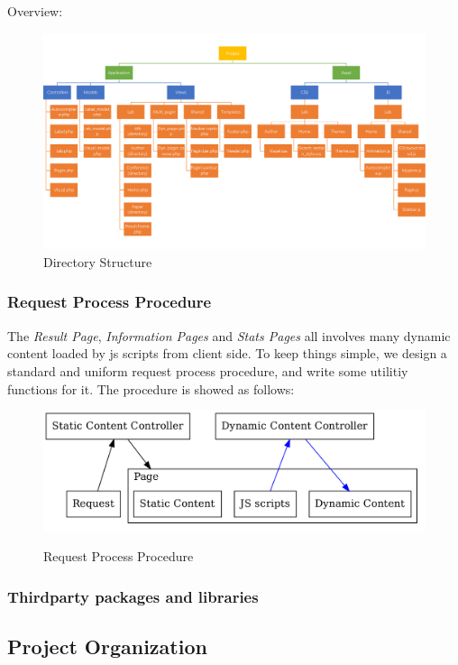 \documentclass[a4paper, 10pt]{article}
\begin{document}
Overview:
\begin{figure}[H]
  \centering
  \includegraphics[width=\textwidth]{directory.png}
  \caption{Directory Structure}
  \label{fig:web_struct}
\end{figure}

\subsubsection{Request Process Procedure}
The \textit{Result Page}, \textit{Information Pages} and \textit{Stats Pages} all involves many dynamic content loaded by js scripts from client side. To keep things simple, we design a standard and uniform request process procedure, and write some utilitiy functions for it.
The procedure is showed as follows:
\begin{figure}[H]
  \centering
  \caption{Request Process Procedure}
  \includegraphics[width=\textwidth]{r_p_p.png}
  \label{fig:r_p_p}
\end{figure}

\subsubsection{Thirdparty packages and libraries}
\subsection{Project Organization}
\end{document}
